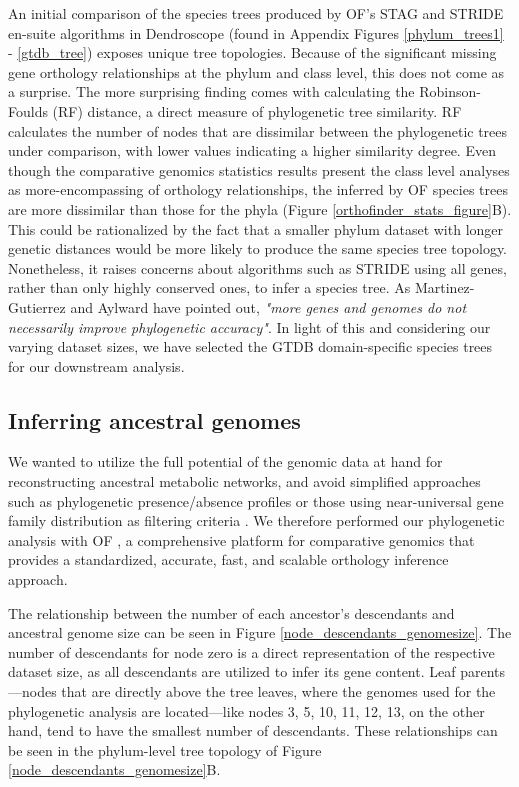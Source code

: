 An initial comparison of the species trees produced by OF's STAG \cite{emms2018} and STRIDE \cite{emms2017} en-suite algorithms in Dendroscope \cite{huson2012} (found in Appendix Figures \ref{phylum_trees1} - \ref{gtdb_tree}) exposes unique tree topologies. Because of the significant missing gene orthology relationships at the phylum and class level, this does not come as a surprise. The more surprising finding comes with calculating the Robinson-Foulds (RF) distance, a direct measure of phylogenetic tree similarity. RF calculates the number of nodes that are dissimilar between the phylogenetic trees under comparison, with lower values indicating a higher similarity degree. Even though the comparative genomics statistics results present the class level analyses as more-encompassing of orthology relationships, the inferred by OF species trees are more dissimilar than those for the phyla (Figure \ref{orthofinder_stats_figure}B). This could be rationalized by the fact that a smaller phylum dataset with longer genetic distances would be more likely to produce the same species tree topology. Nonetheless, it raises concerns about algorithms such as STRIDE using all genes, rather than only highly conserved ones, to infer a species tree. As Martinez-Gutierrez and Aylward \cite{martinez-gutierrez2021} have pointed out, \textit{"more genes and genomes do not necessarily improve phylogenetic accuracy"}. In light of this and considering our varying dataset sizes, we have selected the GTDB domain-specific species trees for our downstream analysis.

\subsection*{Inferring ancestral genomes}

We wanted to utilize the full potential of the genomic data at hand for reconstructing ancestral metabolic networks, and avoid simplified approaches such as phylogenetic presence/absence profiles \cite{kreimer2008} or those using near-universal gene family distribution as filtering criteria \cite{xavier2021}. We therefore performed our phylogenetic analysis with OF \cite{emms2019, emms2015}, a comprehensive platform for comparative genomics that provides a standardized, accurate, fast, and scalable orthology inference approach. 

The relationship between the number of each ancestor's descendants and ancestral genome size can be seen in Figure \ref{node_descendants_genomesize}. The number of descendants for node zero is a direct representation of the respective dataset size, as all descendants are utilized to infer its gene content. Leaf parents---nodes that are directly above the tree leaves, where the genomes used for the phylogenetic analysis are located---like nodes 3, 5, 10, 11, 12, 13, on the other hand, tend to have the smallest number of descendants. These relationships can be seen in the phylum-level tree topology of Figure \ref{node_descendants_genomesize}B.

